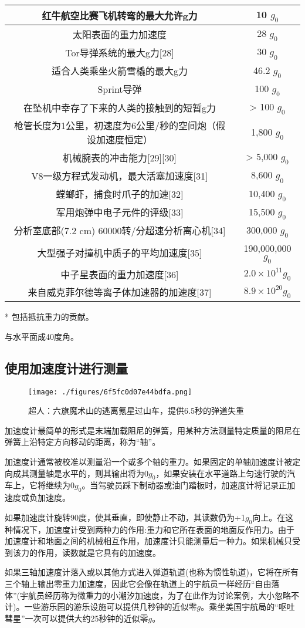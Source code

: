 \begin{table}[ht]
\begin{tabular}{|c|c}
\hline
红牛航空比赛飞机转弯的最大允许g力 & 10 $g_0$ \\
\hline
太阳表面的重力加速度 & 28 $g_0$ \\
\hline
Tor导弹系统的最大g力[28] & 30 $g_0$ \\
\hline
适合人类乘坐火箭雪橇的最大g力 & 46.2 $g_0$ \\
\hline
Sprint导弹 & 100 $g_0$ \\
\hline
在坠机中幸存了下来的人类的接触到的短暂g力 & > 100 $g_0$ \\
\hline
枪管长度为1公里，初速度为6公里/秒的空间炮（假设加速度恒定） & 1,800 $g_0$ \\
\hline
机械腕表的冲击能力[29][30] & > 5,000 $g_0$ \\
\hline
V8一级方程式发动机，最大活塞加速度[31] & 8,600 $g_0$ \\
\hline
螳螂虾，捕食时爪子的加速[32] & 10,400 $g_0$ \\
\hline
军用炮弹中电子元件的评级[33] & 15,500 $g_0$ \\
\hline
分析室底部(7.2 cm) 60000转/分超速分析离心机[34] & 300,000 $g_0$ \\
\hline
大型强子对撞机中质子的平均加速度[35] & 190,000,000 $g_0$ \\
\hline
中子星表面的重力加速度[36] & $2.0\times10^{11} g_0$ \\
\hline
来自威克菲尔德等离子体加速器的加速度[37] & $8.9\times10^{20} g_0$ \\
\hline
\end{tabular}
\end{table}
* 包括抵抗重力的贡献。

与水平面成40度角。

\subsection{使用加速度计进行测量}
\begin{figure}[ht]
\centering
\texttt{[image: ./figures/6f5fc0d07e44bdfa.png]}
\caption{超人：六旗魔术山的逃离氪星过山车，提供6.5秒的弹道失重} \label{fig_GLI_3}
\end{figure}
加速度计最简单的形式是末端加载阻尼的弹簧，用某种方法测量特定质量的阻尼在弹簧上沿特定方向移动的距离，称为“轴”。

加速度计通常被校准以测量沿一个或多个轴的重力。如果固定的单轴加速度计被定向成其测量轴是水平的，则其输出将为0$g_0$，如果安装在水平道路上匀速行驶的汽车上，它将继续为0$g_0$。当驾驶员踩下制动器或油门踏板时，加速度计将记录正加速度或负加速度。

如果加速度计旋转90度，使其垂直，即使静止不动，其读数仍为+1$g_0$向上。在这种情况下，加速度计受到两种力的作用:重力和它所在表面的地面反作用力。由于加速度计和地面之间的机械相互作用，加速度计只能测量后一种力。如果机械只受到该力的作用，读数就是它具有的加速度。

如果三轴加速度计落入或以其他方式进入弹道轨道(也称为惯性轨道)，它将在所有三个轴上输出零重力加速度，因此它会像在轨道上的宇航员一样经历“自由落体”(宇航员经历称为微重力的小潮汐加速度，为了在此作为讨论案例，大小忽略不计)。一些游乐园的游乐设施可以提供几秒钟的近似零$g$。乘坐美国宇航局的“呕吐彗星”一次可以提供大约25秒钟的近似零$g$。